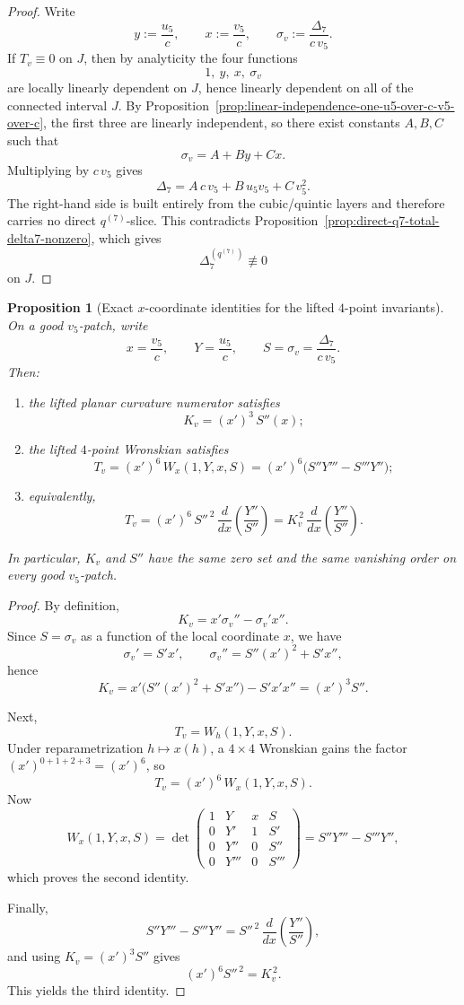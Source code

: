 \documentclass[11pt,a4paper]{amsart}
\theoremstyle{plain}
\newtheorem{proposition}[theorem]{Proposition}
\theoremstyle{definition}
\begin{document}
\begin{proof}
Write
\[
y:=\frac{u_5}{c},
\qquad
x:=\frac{v_5}{c},
\qquad
\sigma_v:=\frac{\Delta_7}{c\,v_5}.
\]
If $T_v\equiv 0$ on $J$, then by analyticity the four functions
\[
1,\ y,\ x,\ \sigma_v
\]
are locally linearly dependent on $J$, hence linearly dependent on all of
the connected interval $J$. By
Proposition~\ref{prop:linear-independence-one-u5-over-c-v5-over-c}, the first
three are linearly independent, so there exist constants $A,B,C$ such that
\[
\sigma_v=A+By+Cx.
\]
Multiplying by $c\,v_5$ gives
\[
\Delta_7=A\,c\,v_5+B\,u_5v_5+C\,v_5^2.
\]
The right-hand side is built entirely from the cubic/quintic layers and
therefore carries no direct $q^{(7)}$-slice. This contradicts
Proposition~\ref{prop:direct-q7-total-delta7-nonzero}, which gives
\[
\Delta_7^{(q^{(7)})}\not\equiv 0
\]
on $J$.
\end{proof}

\begin{proposition}[Exact $x$-coordinate identities for the lifted $4$-point invariants]
\label{prop:exact-x-coordinate-identities-lifted-four-point}
On a good $v_5$-patch, write
\[
x=\frac{v_5}{c},
\qquad
Y=\frac{u_5}{c},
\qquad
S=\sigma_v=\frac{\Delta_7}{c\,v_5}.
\]
Then:
\begin{enumerate}
\item the lifted planar curvature numerator satisfies
\[
K_v=(x')^3\,S''(x);
\]
\item the lifted $4$-point Wronskian satisfies
\[
T_v=(x')^6\,W_x(1,Y,x,S)
=(x')^6\bigl(S''Y'''-S'''Y''\bigr);
\]
\item equivalently,
\[
T_v=(x')^6\,S''^{\,2}\,\frac{d}{dx}\!\left(\frac{Y''}{S''}\right)
=K_v^{\,2}\,\frac{d}{dx}\!\left(\frac{Y''}{S''}\right).
\]
\end{enumerate}
In particular, $K_v$ and $S''$ have the same zero set and the same
vanishing order on every good $v_5$-patch.
\end{proposition}

\begin{proof}
By definition,
\[
K_v=x'\sigma_v''-\sigma_v' x''.
\]
Since $S=\sigma_v$ as a function of the local coordinate $x$, we have
\[
\sigma_v'=S' x',
\qquad
\sigma_v''=S''(x')^2+S' x'',
\]
hence
\[
K_v=x'\bigl(S''(x')^2+S'x''\bigr)-S' x' x''=(x')^3S''.
\]

Next,
\[
T_v=W_h(1,Y,x,S).
\]
Under reparametrization $h\mapsto x(h)$, a $4\times4$ Wronskian gains the
factor $(x')^{0+1+2+3}=(x')^6$, so
\[
T_v=(x')^6\,W_x(1,Y,x,S).
\]
Now
\[
W_x(1,Y,x,S)
=
\det\!\begin{pmatrix}
1&Y&x&S\\
0&Y'&1&S'\\
0&Y''&0&S''\\
0&Y'''&0&S'''
\end{pmatrix}
=
S''Y'''-S'''Y'',
\]
which proves the second identity.

Finally,
\[
S''Y'''-S'''Y''
=
S''^{\,2}\,\frac{d}{dx}\!\left(\frac{Y''}{S''}\right),
\]
and using $K_v=(x')^3S''$ gives
\[
(x')^6S''^{\,2}=K_v^{\,2}.
\]
This yields the third identity.
\end{proof}
\end{document}
